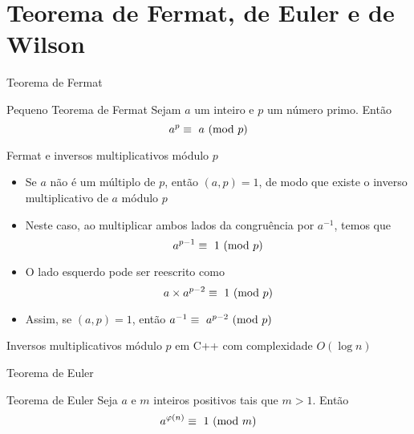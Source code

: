\section{Teorema de Fermat, de Euler e de Wilson}

\begin{frame}[fragile]{Teorema de Fermat}

    \begin{block}{Pequeno Teorema de Fermat}
        Sejam $a$ um inteiro e $p$ um número primo. Então
        $$
            a^p\equiv\ \Mod{a}{p}
        $$
    \end{block}

\end{frame}

\begin{frame}[fragile]{Fermat e inversos multiplicativos módulo $p$}

    \begin{itemize}
        \item Se $a$ não é um múltiplo de $p$, então $(a, p) = 1$, de modo que existe o inverso
            multiplicativo de $a$ módulo $p$

        \item Neste caso, ao multiplicar ambos lados da congruência por $a^{-1}$, temos que
        $$
            a^{p - 1}\equiv\ \Mod{1}{p}
        $$

        \item O lado esquerdo pode ser reescrito como
        $$
            a\times a^{p - 2}\equiv\ \Mod{1}{p}
        $$

        \item Assim, se $(a, p) = 1$, então $a^{-1}\equiv\ a^{p - 2}\ (\mbox{mod}\ p)$
    \end{itemize}

\end{frame}

\begin{frame}[fragile]{Inversos multiplicativos módulo $p$ em C++ com complexidade $O(\log n)$}
\end{frame}

\begin{frame}[fragile]{Teorema de Euler}

    \begin{block}{Teorema de Euler}
        Seja $a$ e $m$ inteiros positivos tais que $m > 1$. Então
        $$
            a^{\varphi(n)}\equiv\ \Mod{1}{m}
        $$
    \end{block}

\end{frame}


